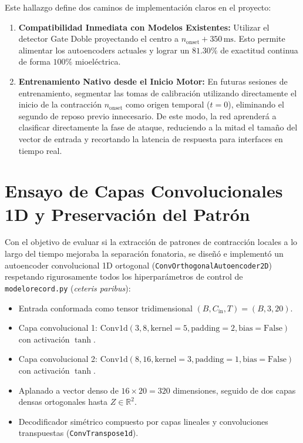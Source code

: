 \documentclass[11pt,a4paper]{article}
\begin{document}
Este hallazgo define dos caminos de implementación claros en el proyecto:
\begin{enumerate}
    \item \textbf{Compatibilidad Inmediata con Modelos Existentes:} Utilizar el detector Gate Doble proyectando el centro a $n_{\text{onset}} + 350\,\text{ms}$. Esto permite alimentar los autoencoders actuales y lograr un $81.30\%$ de exactitud continua de forma $100\%$ mioeléctrica.
    \item \textbf{Entrenamiento Nativo desde el Inicio Motor:} En futuras sesiones de entrenamiento, segmentar las tomas de calibración utilizando directamente el inicio de la contracción $n_{\text{onset}}$ como origen temporal ($t = 0$), eliminando el segundo de reposo previo innecesario. De este modo, la red aprenderá a clasificar directamente la fase de ataque, reduciendo a la mitad el tamaño del vector de entrada y recortando la latencia de respuesta para interfaces en tiempo real.
\end{enumerate}

\section{Ensayo de Capas Convolucionales 1D y Preservación del Patrón}
\label{sec:ensayo_convolucional}

Con el objetivo de evaluar si la extracción de patrones de contracción locales a lo largo del tiempo mejoraba la separación fonatoria, se diseñó e implementó un autoencoder convolucional 1D ortogonal (\texttt{ConvOrthogonalAutoencoder2D}) respetando rigurosamente todos los hiperparámetros de control de \texttt{modelorecord.py} (\textit{ceteris paribus}):
\begin{itemize}
    \item Entrada conformada como tensor tridimensional $(B, C_{\text{in}}, T) = (B, 3, 20)$.
    \item Capa convolucional 1: $\text{Conv1d}(3, 8, \text{kernel}=5, \text{padding}=2, \text{bias}=\text{False})$ con activación $\tanh$.
    \item Capa convolucional 2: $\text{Conv1d}(8, 16, \text{kernel}=3, \text{padding}=1, \text{bias}=\text{False})$ con activación $\tanh$.
    \item Aplanado a vector denso de $16 \times 20 = 320$ dimensiones, seguido de dos capas densas ortogonales hasta $Z \in \mathbb{R}^2$.
    \item Decodificador simétrico compuesto por capas lineales y convoluciones transpuestas (\texttt{ConvTranspose1d}).
\end{itemize}
\end{document}
